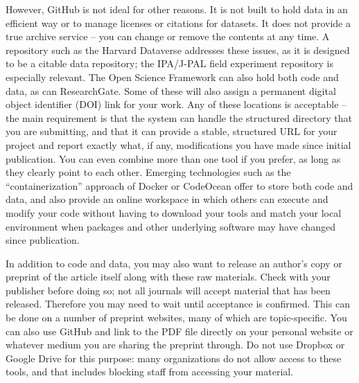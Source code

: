 However, GitHub is not ideal for other reasons.
It is not built to hold data in an efficient way
or to manage licenses or citations for datasets.
It does not provide a true archive service --
you can change or remove the contents at any time.
A repository such as the Harvard Dataverse
addresses these issues, as it is designed to be a citable data repository;
the IPA/J-PAL field experiment repository is especially relevant.
The Open Science Framework
can also hold both code and data,
as can ResearchGate.
Some of these will also assign a permanent digital object identifier (DOI) link for your work.
Any of these locations is acceptable --
the main requirement is that the system can handle
the structured directory that you are submitting,
and that it can provide a stable, structured URL for your project
and report exactly what, if any, modifications you have made since initial publication.
You can even combine more than one tool if you prefer,
as long as they clearly point to each other.
Emerging technologies such as the ``containerization'' approach of Docker or CodeOcean
offer to store both code and data,
and also provide an online workspace in which others can execute and modify your code
without having to download your tools and match your local environment
when packages and other underlying software may have changed since publication.

In addition to code and data,
you may also want to release an author's copy or preprint
of the article itself along with these raw materials.
Check with your publisher before doing so;
not all journals will accept material that has been released.
Therefore you may need to wait until acceptance is confirmed.
This can be done on a number of preprint websites,
many of which are topic-specific.
You can also use GitHub and link to the PDF file directly
on your personal website or whatever medium you are
sharing the preprint through.
Do not use Dropbox or Google Drive for this purpose:
many organizations do not allow access to these tools,
and that includes blocking staff from accessing your material.
